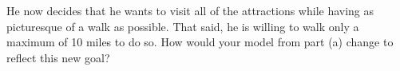 \documentclass[12pt]{exam}
\begin{document}
\begin{questions}
\begin{parts}
He now decides that he wants to visit all of the attractions while having as picturesque of a walk as possible. That said, he is willing to walk only a maximum of 10 miles to do so. How would your model from part (a) change to reflect this new goal?

\end{parts}


\end{questions}
\end{document}
